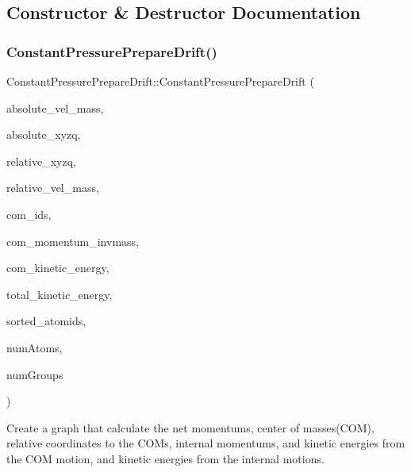 \subsection{Constructor \& Destructor Documentation}
\hypertarget{classConstantPressurePrepareDrift_acdf4bbe89bee70df889d745f1c8cf08c}{}\label{classConstantPressurePrepareDrift_acdf4bbe89bee70df889d745f1c8cf08c} 
\subsubsection{\texorpdfstring{Constant\+Pressure\+Prepare\+Drift()}{ConstantPressurePrepareDrift()}}
{\footnotesize\ttfamily Constant\+Pressure\+Prepare\+Drift\+::\+Constant\+Pressure\+Prepare\+Drift (\begin{DoxyParamCaption}\item[{const double4 $\ast$\+\_\+\+\_\+restrict\+\_\+\+\_\+}]{absolute\+\_\+vel\+\_\+mass,  }\item[{const double4 $\ast$\+\_\+\+\_\+restrict\+\_\+\+\_\+}]{absolute\+\_\+xyzq,  }\item[{double4 $\ast$\+\_\+\+\_\+restrict\+\_\+\+\_\+}]{relative\+\_\+xyzq,  }\item[{double4 $\ast$\+\_\+\+\_\+restrict\+\_\+\+\_\+}]{relative\+\_\+vel\+\_\+mass,  }\item[{\hyperlink{structComID__t}{Com\+I\+D\+\_\+t} $\ast$\+\_\+\+\_\+restrict\+\_\+\+\_\+}]{com\+\_\+ids,  }\item[{double4 $\ast$\+\_\+\+\_\+restrict\+\_\+\+\_\+}]{com\+\_\+momentum\+\_\+invmass,  }\item[{double3 $\ast$\+\_\+\+\_\+restrict\+\_\+\+\_\+}]{com\+\_\+kinetic\+\_\+energy,  }\item[{double $\ast$\+\_\+\+\_\+restrict\+\_\+\+\_\+}]{total\+\_\+kinetic\+\_\+energy,  }\item[{const int $\ast$}]{sorted\+\_\+atomids,  }\item[{int}]{num\+Atoms,  }\item[{int}]{num\+Groups }\end{DoxyParamCaption})}



Create a graph that calculate the net momentums, center of masses(\+C\+O\+M), relative coordinates to the C\+O\+Ms, internal momentums, and kinetic energies from the C\+OM motion, and kinetic energies from the internal motions. 

